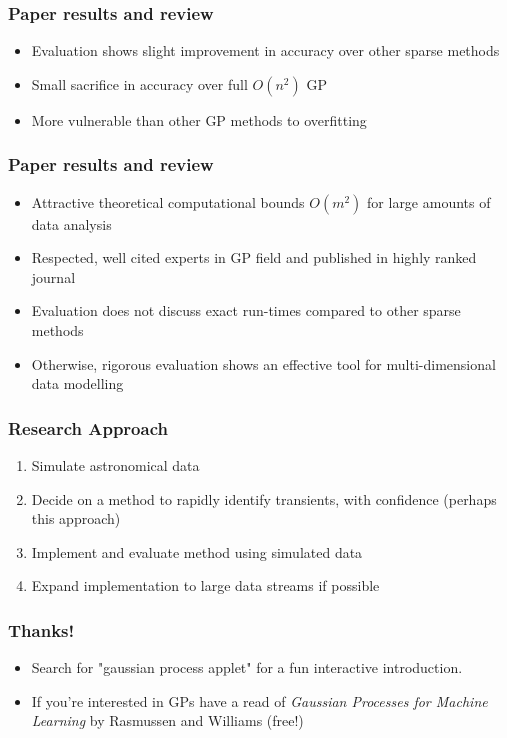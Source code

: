 \documentclass[12pt]{beamer}
\begin{document}
\begin{frame}
	\frametitle{Paper results and review}
	\begin{itemize}
		\item Evaluation shows slight improvement in accuracy over other sparse methods
		\item Small sacrifice in accuracy over full $O(n^{2})$ GP
		\item More vulnerable than other GP methods to overfitting
	\end{itemize}
	\begin{figure}
	\end{figure}
\end{frame}

\begin{frame}
  \frametitle{Paper results and review}
		\begin{itemize}
			\item Attractive theoretical computational bounds $O(m^{2})$ for large amounts of data analysis
			\item Respected, well cited experts in GP field and published in highly ranked journal
			\item Evaluation does not discuss exact run-times compared to other sparse methods
			\item Otherwise, rigorous evaluation shows an effective tool for multi-dimensional data modelling
		\end{itemize}
\end{frame}

\begin{frame}
	\frametitle{Research Approach}
	\begin{enumerate}
	  \item Simulate astronomical data 
	  \item Decide on a method to rapidly identify transients, with confidence (perhaps this approach)
	  \item Implement and evaluate method using simulated data
	  \item Expand implementation to large data streams if possible
	\end{enumerate}
\end{frame}

\begin{frame}
	\frametitle{Thanks!}
	\begin{itemize}
		\item Search for "gaussian process applet" for a fun interactive introduction.
		\item If you're interested in GPs have a read of \emph{Gaussian Processes for Machine Learning} by Rasmussen and Williams (free!)
	\end{itemize}
\end{frame}
%
\end{document}
